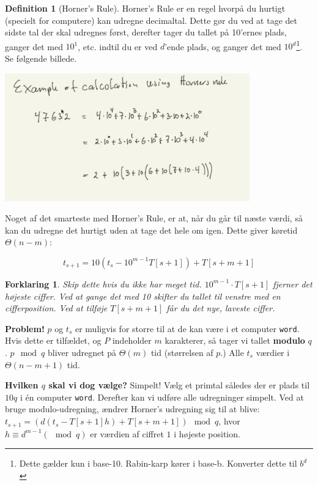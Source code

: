 \documentclass[11pt]{article}
\newtheorem{forklaring}[theorem]{Forklaring}
\theoremstyle{definition}
\newtheorem{definition}{Definition}
\theoremstyle{remark}
\begin{document}
\begin{definition}[Horner's Rule]
  \label{def:horner}
  Horner's Rule er en regel hvorpå du hurtigt (specielt for computere) kan udregne decimaltal. Dette gør du ved at tage det sidste tal der skal udregnes først, derefter tager du tallet på 10'ernes plads, ganger det med $10^{1}$, etc. indtil du er ved $d$'ende plads, og ganger det med $10^{d}$\footnote{Dette gælder kun i base-10. Rabin-karp kører i base-b. Konverter dette til $b^{d}$}. Se følgende billede.


    \includegraphics[width=300pt]{../Question8/main--the-naive-string-matching-algorithm--rabin-karp-c553.png} 
\end{definition}

Noget af det smarteste med Horner's Rule, er at, når du går til næste værdi, så kan du udregne det hurtigt uden at tage det hele om igen. Dette giver køretid $\Theta(n-m)$:

\[ t_{s+1} = 10(t_{s} - 10^{m-1}T[s+1]) + T[s+m+1] \]


\begin{forklaring}
\textit{Skip dette hvis du ikke har meget tid.} $10^{m-1} \cdot T[s+1]$ fjerner det højeste ciffer. Ved at gange det med 10 skifter du tallet til venstre med en cifferposition. Ved at tilføje $T[s+m+1]$ får du det nye, laveste ciffer. 
\end{forklaring}

\textbf{Problem!} $p$ og $t_{s}$ er muligvis for storre til at de kan være i et computer \texttt{word}. Hvis dette er tilfældet, og $P$ indeholder $m$ karakterer, så tager vi tallet \textbf{modulo }$q$. $p \mod q$ bliver udregnet på $\Theta(m)$ tid (størrelsen af $p$.) Alle $t_{s}$ værdier i $\Theta(n-m+1)$ tid.

\textbf{Hvilken $q$ skal vi dog vælge?} Simpelt! Vælg et primtal således der er plads til $10q$  i én computer \texttt{word}. Derefter kan vi udføre alle udregninger simpelt. Ved at bruge modulo-udregning, ændrer Horner's udregning sig til at blive: $t_{s+1} = (d(t_{s} - T[s+1]h) + T[s+m+1]) \mod q$, hvor $h \equiv d^{m-1} (\mod q)$ er værdien af ciffret $1$ i højeste position. 
\end{document}
